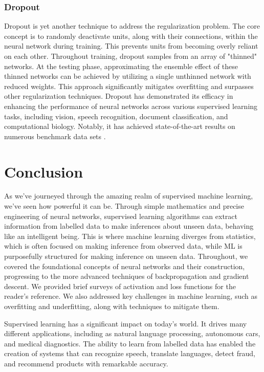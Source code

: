 \documentclass{article}
\begin{document}
\subsubsection{Dropout}%
  \label{sub:Dropout}
  Dropout is yet another technique to address the regularization problem. The core concept is to randomly deactivate units, along with their connections, within the neural network during training. This prevents units from becoming overly reliant on each other. Throughout training, dropout samples from an array of "thinned" networks. At the testing phase, approximating the ensemble effect of these thinned networks can be achieved by utilizing a single unthinned network with reduced weights. This approach significantly mitigates overfitting and surpasses other regularization techniques. Dropout has demonstrated its efficacy in enhancing the performance of neural networks across various supervised learning tasks, including vision, speech recognition, document classification, and computational biology. Notably, it has achieved state-of-the-art results on numerous benchmark data sets \citep{JMLR:v15:srivastava14a}.
    \section{Conclusion}%
    \label{sec:Conclusion}
As we've journeyed through the amazing realm of supervised machine learning, we've seen how powerful it can be. Through simple mathematics and precise engineering of neural networks, supervised learning algorithms can extract information from labelled data to make inferences about unseen data, behaving like an intelligent being. This is where machine learning diverges from statistics, which is often focused on making inference from observed data, while ML is purposefully structured for making inference on unseen data. Throughout, we covered the foundational concepts of neural networks and their construction, progressing to the more advanced techniques of backpropagation and gradient descent. We provided brief surveys of activation and loss functions for the reader's reference. We also addressed key challenges in machine learning, such as overfitting and underfitting, along with techniques to mitigate them.


Supervised learning has a significant impact on today's world. It drives many different applications, including as natural language processing, autonomous cars, and medical diagnostics. The ability to learn from labelled data has enabled the creation of systems that can recognize speech, translate languages, detect fraud, and recommend products with remarkable accuracy.
\end{document}
